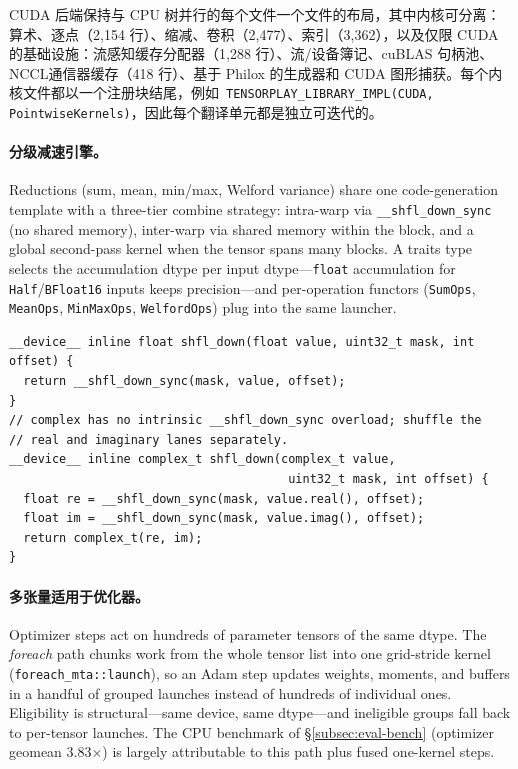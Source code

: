 CUDA 后端保持与 CPU 树并行的每个文件一个文件的布局，其中内核可分离：算术、逐点（2{,}154 行）、缩减、卷积（2{,}477）、索引（3{,}362），以及仅限 CUDA 的基础设施：流感知缓存分配器（1{,}288 行）、流/设备簿记、cuBLAS 句柄池、NCCL通信器缓存（418 行）、基于 Philox 的生成器和 CUDA 图形捕获。每个内核文件都以一个注册块结尾，例如\ \texttt{TENSORPLAY\_LIBRARY\_IMPL(CUDA, PointwiseKernels)}，因此每个翻译单元都是独立可迭代的。

\paragraph{分级减速引擎。} Reductions (sum, mean, min/max, Welford variance) share one code-generation template with a three-tier combine strategy: intra-warp via \texttt{\_\_shfl\_down\_sync} (no shared memory), inter-warp via shared memory within the block, and a global second-pass kernel when the tensor spans many blocks. A traits type selects the accumulation dtype per input dtype---\texttt{float} accumulation for \texttt{Half}/\texttt{BFloat16} inputs keeps precision---and per-operation functors (\texttt{SumOps}, \texttt{MeanOps}, \texttt{MinMaxOps}, \texttt{WelfordOps}) plug into the same launcher.

\begin{lstlisting}[caption={The intra-warp tier of the shared reduction template; complex numbers shuffle their two lanes because the shuffle intrinsic has no complex overload.}, label=lst:cudareduce]
__device__ inline float shfl_down(float value, uint32_t mask, int offset) {
  return __shfl_down_sync(mask, value, offset);
}
// complex has no intrinsic __shfl_down_sync overload; shuffle the
// real and imaginary lanes separately.
__device__ inline complex_t shfl_down(complex_t value,
                                       uint32_t mask, int offset) {
  float re = __shfl_down_sync(mask, value.real(), offset);
  float im = __shfl_down_sync(mask, value.imag(), offset);
  return complex_t(re, im);
}
\end{lstlisting}

\paragraph{多张量适用于优化器。} Optimizer steps act on hundreds of parameter tensors of the same dtype. The \emph{foreach} path chunks work from the whole tensor list into one grid-stride kernel (\texttt{foreach\_mta::launch}), so an Adam step updates weights, moments, and buffers in a handful of grouped launches instead of hundreds of individual ones. Eligibility is structural---same device, same dtype---and ineligible groups fall back to per-tensor launches. The CPU benchmark of \S\ref{subsec:eval-bench} (optimizer geomean 3.83$\times$) is largely attributable to this path plus fused one-kernel steps.

